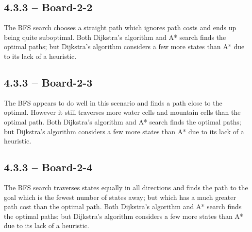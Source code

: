 
\newpage
\subsection*{4.3.3 -- Board-2-2}

The \ac{BFS} search chooses a straight path which ignores path costs and ends up being quite suboptimal. Both Dijkstra's algorithm and A* search finds the optimal paths; but Dijkstra's algorithm considers a few more states than A* due to its lack of a heuristic.


\newpage
\subsection*{4.3.3 -- Board-2-3}

The \ac{BFS} appears to do well in this scenario and finds a path close to the optimal. However it still traverses more water cells and mountain cells than the optimal path. Both Dijkstra's algorithm and A* search finds the optimal paths; but Dijkstra's algorithm considers a few more states than A* due to its lack of a heuristic.


\newpage
\subsection*{4.3.3 -- Board-2-4}

The \ac{BFS} search traverses states equally in all directions and finds the path to the goal which is the fewest number of states away; but which has a much greater path cost than the optimal path. Both Dijkstra's algorithm and A* search finds the optimal paths; but Dijkstra's algorithm considers a few more states than A* due to its lack of a heuristic.




